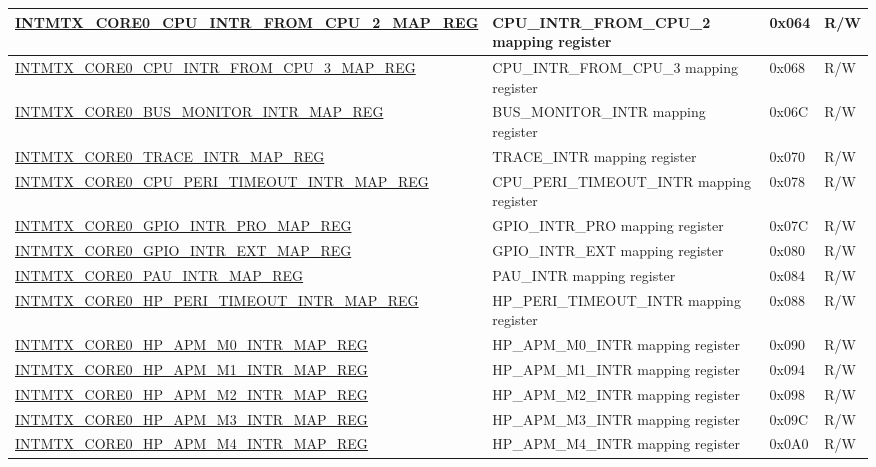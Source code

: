 \begin{longtable}{ | p{10cm} | p{10cm} | p{1.3cm} | p{1cm} | }
\hyperref[regdesc:INTMTXCORE0CPUINTRFROMCPU2MAPREG]{INTMTX\_CORE0\_CPU\_INTR\_FROM\_CPU\_2\_MAP\_REG} & CPU\_INTR\_FROM\_CPU\_2 mapping register & 0x064 & R/W  \\ \hline
\hyperref[regdesc:INTMTXCORE0CPUINTRFROMCPU3MAPREG]{INTMTX\_CORE0\_CPU\_INTR\_FROM\_CPU\_3\_MAP\_REG} & CPU\_INTR\_FROM\_CPU\_3 mapping register & 0x068 & R/W  \\ \hline
\hyperref[regdesc:INTMTXCORE0BUSMONITORINTRMAPREG]{INTMTX\_CORE0\_BUS\_MONITOR\_INTR\_MAP\_REG} & BUS\_MONITOR\_INTR mapping register & 0x06C & R/W  \\ \hline
\hyperref[regdesc:INTMTXCORE0TRACEINTRMAPREG]{INTMTX\_CORE0\_TRACE\_INTR\_MAP\_REG} & TRACE\_INTR mapping register & 0x070 & R/W  \\ \hline
\hyperref[regdesc:INTMTXCORE0CPUPERITIMEOUTINTRMAPREG]{INTMTX\_CORE0\_CPU\_PERI\_TIMEOUT\_INTR\_MAP\_REG} & CPU\_PERI\_TIMEOUT\_INTR mapping register & 0x078 & R/W  \\ \hline
\hyperref[regdesc:INTMTXCORE0GPIOINTRPROMAPREG]{INTMTX\_CORE0\_GPIO\_INTR\_PRO\_MAP\_REG} & GPIO\_INTR\_PRO mapping register & 0x07C & R/W  \\ \hline
\hyperref[regdesc:INTMTXCORE0GPIOINTREXTMAPREG]{INTMTX\_CORE0\_GPIO\_INTR\_EXT\_MAP\_REG} & GPIO\_INTR\_EXT mapping register & 0x080 & R/W  \\ \hline
\hyperref[regdesc:INTMTXCORE0PAUINTRMAPREG]{INTMTX\_CORE0\_PAU\_INTR\_MAP\_REG} & PAU\_INTR mapping register & 0x084 & R/W  \\ \hline
\hyperref[regdesc:INTMTXCORE0HPPERITIMEOUTINTRMAPREG]{INTMTX\_CORE0\_HP\_PERI\_TIMEOUT\_INTR\_MAP\_REG} & HP\_PERI\_TIMEOUT\_INTR mapping register & 0x088 & R/W  \\ \hline
\hyperref[regdesc:INTMTXCORE0HPAPMM0INTRMAPREG]{INTMTX\_CORE0\_HP\_APM\_M0\_INTR\_MAP\_REG} & HP\_APM\_M0\_INTR mapping register & 0x090 & R/W  \\ \hline
\hyperref[regdesc:INTMTXCORE0HPAPMM1INTRMAPREG]{INTMTX\_CORE0\_HP\_APM\_M1\_INTR\_MAP\_REG} & HP\_APM\_M1\_INTR mapping register & 0x094 & R/W  \\ \hline
\hyperref[regdesc:INTMTXCORE0HPAPMM2INTRMAPREG]{INTMTX\_CORE0\_HP\_APM\_M2\_INTR\_MAP\_REG} & HP\_APM\_M2\_INTR mapping register & 0x098 & R/W  \\ \hline
\hyperref[regdesc:INTMTXCORE0HPAPMM3INTRMAPREG]{INTMTX\_CORE0\_HP\_APM\_M3\_INTR\_MAP\_REG} & HP\_APM\_M3\_INTR mapping register & 0x09C & R/W  \\ \hline
\hyperref[regdesc:INTMTXCORE0HPAPMM4INTRMAPREG]{INTMTX\_CORE0\_HP\_APM\_M4\_INTR\_MAP\_REG} & HP\_APM\_M4\_INTR mapping register & 0x0A0 & R/W  \\ \hline

\end{longtable}
